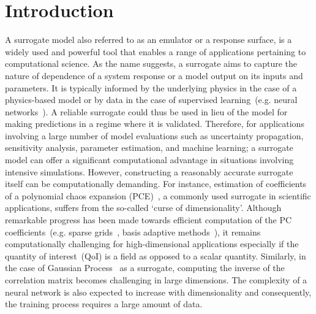 \section{Introduction}
\label{sec:intro}


A surrogate model also referred to as an emulator or a response surface,
is a widely used and powerful tool that enables a range of applications pertaining to 
computational science. As the name suggests, a surrogate aims to capture the nature of dependence of a system
response or a model output on its inputs and parameters. It is typically informed by the underlying physics in the 
case of a physics-based model or by data in the case of supervised learning~(e.g. neural networks~\cite{Hagan:1996}).
A reliable surrogate could thus
be used in lieu of the model for making predictions in a regime where it is validated. Therefore, for applications
involving a large number of model evaluations such as uncertainty propagation, sensitivity analysis, parameter
estimation, and machine learning; a surrogate model can offer a significant computational advantage in situations involving 
intensive simulations. However, constructing a reasonably accurate surrogate itself can be computationally demanding.
For instance, estimation of coefficients of a polynomial chaos expansion (PCE)~\cite{Xiu:2002,Ghanem:1991},
a commonly used surrogate
in scientific applications, suffers from the so-called `curse of dimensionality'. Although remarkable progress has been 
made towards efficient computation of the PC coefficients~(e.g. sparse 
grids~\cite{Gerstner:1998,Ganapathysubramanian:2007}, basis adaptive 
methods~\cite{Blatman:2011,Conrad:2013,Winokur:2013}), it remains computationally challenging for high-dimensional 
applications especially if the quantity of interest~(QoI) is a field as opposed 
to a scalar quantity. Similarly, in the case of Gaussian 
Process~\cite{Rasmussen:2004} as
a surrogate, computing the inverse of the correlation matrix becomes challenging in large dimensions. The complexity of
a neural network is also expected to increase with dimensionality and consequently, the training process requires a large
amount of data. 

